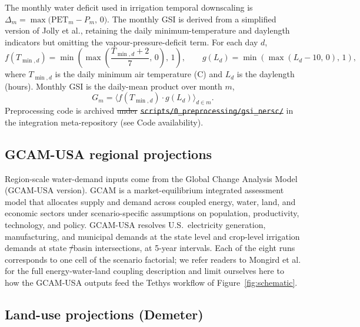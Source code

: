 \documentclass[fleqn,10pt]{wlscirep}
\providecommand{\DIFadd}[1]{{\protect\color{blue}\uwave{#1}}} %
\providecommand{\DIFdel}[1]{{\protect\color{red}\sout{#1}}} %
\providecommand{\DIFaddbegin}{} %
\providecommand{\DIFaddend}{} %
\providecommand{\DIFdelbegin}{} %
\providecommand{\DIFdelend}{} %
\begin{document}
The monthly water deficit used in irrigation temporal downscaling is $\Delta_m = \max\!\big(\text{PET}_m - P_m,\, 0\big)$. The monthly GSI is derived from a simplified version of Jolly et al.\cite{Jolly_2005}, retaining the daily minimum-temperature and daylength indicators but omitting the vapour-pressure-deficit term. For each day $d$,
\begin{equation}
f(T_{\min,d}) = \min\!\left(\max\!\left(\frac{T_{\min,d}+2}{7},\,0\right),\,1\right), \qquad
g(L_d) = \min\!\left(\max\!\left(L_d - 10,\,0\right),\,1\right),
\label{eq:gsi-components}
\end{equation}
where $T_{\min,d}$ is the daily minimum air temperature (\textdegree C) and $L_d$ is the daylength (hours). Monthly GSI is the daily-mean product over month $m$,
\begin{equation}
G_m = \big\langle f(T_{\min,d}) \cdot g(L_d) \big\rangle_{d \in m}.
\label{eq:gsi-monthly}
\end{equation}
Preprocessing code is archived \DIFdelbegin \DIFdel{under }\texttt{\DIFdel{scripts/0\_preprocessing/gsi\_nersc/}} %
\DIFdelend in the integration meta-repository (see Code availability).

\subsection*{GCAM-USA regional projections}

Region-scale water-demand inputs come from the Global Change Analysis Model (GCAM-USA version)\cite{Zhao_gcamusa_water,Zhao2024,Calvin2019GCAM,Binsted_2022}. GCAM is a market-equilibrium integrated assessment model that allocates supply and demand across coupled energy, water, land, and economic sectors under scenario-specific assumptions on population, productivity, technology, and policy. GCAM-USA resolves U.S.\ electricity generation, manufacturing, and municipal demands at the state level and crop-level irrigation demands at state \DIFdelbegin \DIFdel{/}\DIFdelend \DIFaddbegin \DIFadd{$\times$ }\DIFaddend basin intersections, at 5-year intervals. Each of the eight runs corresponds to one cell of the scenario factorial; we refer readers to Mongird et al.\cite{Mongird2025CERF} for the full energy-water-land coupling description and limit ourselves here to how the GCAM-USA outputs feed the Tethys workflow of Figure~\ref{fig:schematic}.

\subsection*{Land-use projections (Demeter)}
\end{document}

